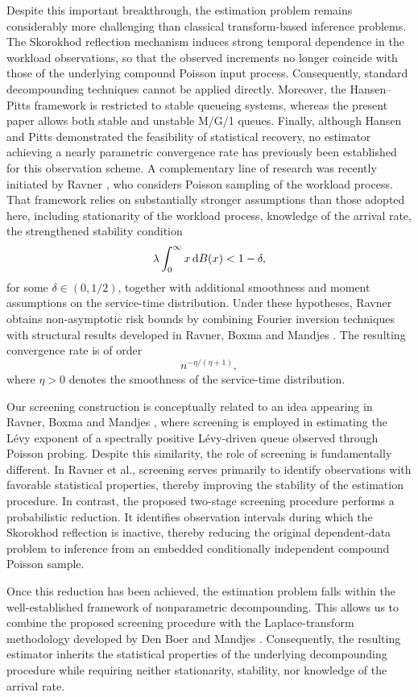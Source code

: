 \documentclass[12pt]{article}
\newcommand{\1}{\mathbf{1}}
\begin{document}
Despite this important breakthrough, the estimation problem remains
considerably more challenging than classical transform-based inference
problems. The Skorokhod reflection mechanism induces strong temporal
dependence in the workload observations, so that the observed increments no
longer coincide with those of the underlying compound Poisson input process.
Consequently, standard decompounding techniques cannot be applied directly.
Moreover, the Hansen--Pitts framework is restricted to stable queueing systems,
whereas the present paper allows both stable and unstable M/G/1 queues.
Finally, although Hansen and Pitts demonstrated the feasibility of statistical
recovery, no estimator achieving a nearly parametric convergence rate has
previously been established for this observation scheme.
A complementary line of research was recently initiated by Ravner
\cite{Ravner2026}, who considers Poisson sampling of the workload process.
That framework relies on substantially stronger assumptions than those adopted
here, including stationarity of the workload process, knowledge of the arrival
rate, the strengthened stability condition
\[
\lambda\int_0^\infty x\,{\rm d}B(x)<1-\delta,
\]
for some $\delta\in(0,1/2)$, together with additional smoothness and moment
assumptions on the service-time distribution. Under these hypotheses, Ravner
obtains non-asymptotic risk bounds by combining Fourier inversion techniques
with structural results developed in Ravner, Boxma and Mandjes
\cite{Ravner2019}. The resulting convergence rate is of order
\[
n^{-\eta/(\eta+1)},
\]
where $\eta>0$ denotes the smoothness of the service-time distribution.

Our screening construction is conceptually related to an idea appearing in
Ravner, Boxma and Mandjes \cite[Section~5]{Ravner2019}, where screening is
employed in estimating the Lévy exponent of a spectrally positive Lévy-driven
queue observed through Poisson probing. Despite this similarity, the role of
screening is fundamentally different. In Ravner et al., screening serves
primarily to identify observations with favorable statistical properties,
thereby improving the stability of the estimation procedure. In contrast, the
proposed two-stage screening procedure performs a probabilistic reduction. It
identifies observation intervals during which the Skorokhod reflection is
inactive, thereby reducing the original dependent-data problem to inference
from an embedded conditionally independent compound Poisson sample.

Once this reduction has been achieved, the estimation problem falls within the
well-established framework of nonparametric decompounding. This allows us to
combine the proposed screening procedure with the Laplace-transform methodology
developed by Den Boer and Mandjes \cite{Den Boer2017}. Consequently, the
resulting estimator inherits the statistical properties of the underlying
decompounding procedure while requiring neither stationarity, stability, nor
knowledge of the arrival rate.
\end{document}
